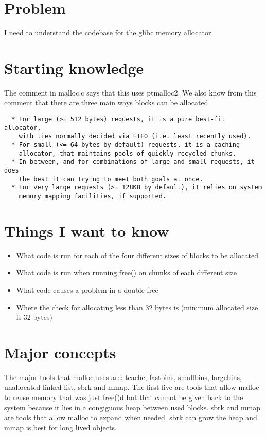\maketitle

\section{Problem}

I need to understand the codebase for the glibc memory allocator. 

\section{Starting knowledge}
The comment in malloc.c says that this uses ptmalloc2. We also know from this comment that there are three main ways blocks can be allocated. 
\begin{verbatim}
  * For large (>= 512 bytes) requests, it is a pure best-fit allocator,
    with ties normally decided via FIFO (i.e. least recently used).
  * For small (<= 64 bytes by default) requests, it is a caching
    allocator, that maintains pools of quickly recycled chunks.
  * In between, and for combinations of large and small requests, it does
    the best it can trying to meet both goals at once.
  * For very large requests (>= 128KB by default), it relies on system
    memory mapping facilities, if supported.
\end{verbatim}

\section{Things I want to know}
\begin{itemize}
  \item What code is run for each of the four different sizes of blocks to be allocated 
  \item What code is run when running free() on chunks of each different size 
  \item What code causes a problem in a double free
  \item Where the check for allocating less than 32 bytes is (minimum allocated size is 32 bytes)
\end{itemize}

\section{Major concepts}
The major tools that malloc uses are: tcache, fastbins, smallbins, largebins, unallocated linked list, sbrk and mmap. The first five are tools that allow malloc to reuse memory that was just free()d but that cannot be given back to the system because it lies in a congiguous heap between used blocks. sbrk and mmap are tools that allow malloc to expand when needed. sbrk can grow the heap and mmap is best for long lived objects. 

